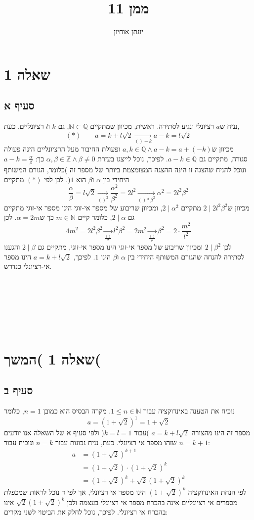 \documentclass[11pt, oneside]{article}
\title{ממן 11}
\author{יונתן אוחיון}
\newcommand{\qed}{\R{$\blacksquare$}}
\newcommand{\br}{\\\\\\\\\\\\\\}
\newcommand{\opr}[1]{\xrightarrow[\text{#1}]{}}
\newcommand{\mN}{\mathbb{N}}
\newcommand{\mZ}{\mathbb{Z}}
\newcommand{\mQ}{\mathbb{Q}}
\newcommand{\q}[3]{\R{שאלה #3#2.#1}}
\begin{document}
\maketitle

\section{שאלה 1}
\subsection{סעיף א}
נניח ש$a$ רציונלי ונגיע לסתירה. ראשית, מכיוון שמתקיים $\mN \subset \mQ$, גם $k$ ו$l$ רציונליים. כעת,
\[
(*)\qquad a = k + l\sqrt{2} \opr{$() - k$} a - k = l\sqrt{2}
\]
מכיוון ש$a, k \in \mQ \land a - k = a + (-k)$ ופעולת החיבור מעל הרציונליים הינה פעולה סגורה, מתקיים גם $a - k \in \mQ$. לפיכך, נוכל לייצגו בעזרת $\alpha, \beta \in \mZ \land \beta \neq 0$ כך: $a - k = \frac{\alpha}{\beta}$ ונוכל להניח שהצגה זו הינה ההצגה המצומצמת ביותר של מספר זה )כלומר, הגורם המשותף היחידי בין $\alpha$ ו$\beta$ הוא $1$(. לכן לפי $(*)$ מתקיים
\[
\frac{\alpha}{\beta} = l\sqrt{2} \opr{$()^2$}
\frac{\alpha^2}{\beta^2} = 2l^2 \opr{$() * \beta^2$}
\alpha^2 = 2l^2\beta^2
\]
מכיוון ש$2 \mid 2l^2\beta^2$ מתקיים $2 \mid \alpha^2$, ומכיוון שריבוע של מספר אי-זוגי הינו מספר אי-זוגי מתקיים גם $2 \mid \alpha$, כלומר קיים $m \in \mN$ כך ש$\alpha = 2m$. לכן
\[
4m^2 = 2l^2\beta^2 \opr{$\frac{()}{2}$}
l^2\beta^2 = 2m^2 \opr{$\frac{()}{l^2}$}
\beta^2 = 2 \cdot \frac{m^2}{l^2}
\]
לכן $2 \mid \beta^2$ ומכיוון שריבוע של מספר אי-זוגי הינו מספר אי-זוגי, מתקיים גם $2 \mid \beta$ והגענו לסתירה להנחה שהגורם המשותף היחידי בין $\alpha$ ו$\beta$ הינו $1$. לפיכך, $a = k + l\sqrt{2}$ הינו מספר אי-רציונלי כנדרש.
\br\qed

\clearpage
\setcounter{section}{0}
\section{שאלה 1 )המשך(}
\subsection{סעיף ב}
נוכיח את הטענה באינדוקציה עבור $1 \le n \in \mN$. מקרה הבסיס הוא כמובן $n = 1$, כלומר
\[
a = (1 + \sqrt{2})^1 = 1 + \sqrt{2}
\]
מספר זה הינו מהצורה $a = k + l\sqrt{2}$ )עבור $k = l = 1$( ולפי סעיף א של השאלה אנו יודעים שזהו מספר אי רציונלי. כעת, נניח נכונות עבור $n = k$ ונוכיח עבור $n = k + 1$:
\begin{align*}
a
&= (1 + \sqrt{2})^{k + 1}\\
&= (1 + \sqrt{2}) \cdot (1 + \sqrt{2})^k\\
&= (1 + \sqrt{2})^k + \sqrt{2}(1 + \sqrt{2})^k
\end{align*}
לפי הנחת האינדוקציה $(1 + \sqrt{2})^k$ הינו מספר אי רציונלי, אך לפי \q{1}{16}{}ד נוכל לראות שמכפלת מספרים אי רציונליים אינה בהכרח מספר אי רציונלי בעצמה ולכן $\sqrt{2}(1 + \sqrt{2})^k$ אינו בהכרח אי רציונלי. לפיכך, נוכל לחלק את הביטוי לשני מקרים:
\end{document}
